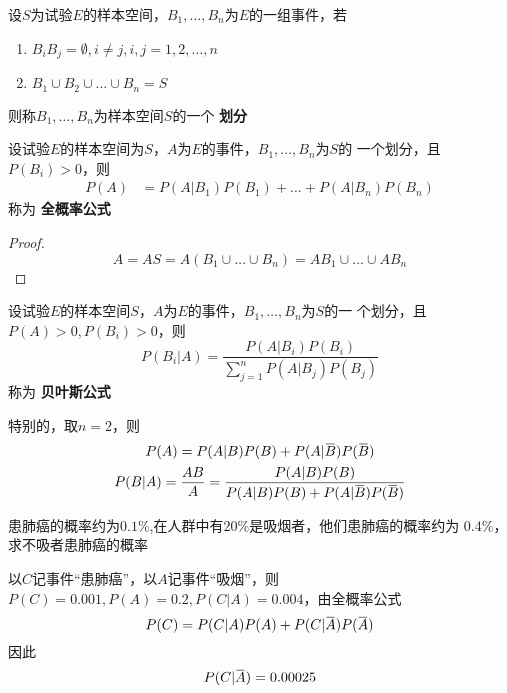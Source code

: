 \documentclass[11pt]{article}
\begin{document}
\begin{definition}[]
设\(S\)为试验\(E\)的样本空间，\(B_1,\dots,B_n\)为\(E\)的一组事件，若
\begin{enumerate}
\item \(B_iB_j=\emptyset,i\neq j,i,j=1,2,\dots,n\)
\item \(B_1\cup B_2\cup\dots\cup B_n=S\)
\end{enumerate}


则称\(B_1,\dots,B_n\)为样本空间\(S\)的一个 \textbf{划分}
\end{definition}

\begin{theorem}[]
设试验\(E\)的样本空间为\(S\)，\(A\)为\(E\)的事件，\(B_1,\dots,B_n\)为\(S\)的
一个划分，且\(\iffalse<\fi P(B_i)>0\)，则
\begin{align*}
P(A)&=P(A|B_1)P(B_1)+\dots+P(A|B_n)P(B_n)
\end{align*}
称为 \textbf{全概率公式} 
\end{theorem}

\begin{proof}
\begin{equation*}
A=AS=A(B_1\cup\dots\cup B_n)=AB_1\cup\dots\cup AB_n
\end{equation*}
\end{proof}

\begin{theorem}[]
设试验\(E\)的样本空间\(S\)，\(A\)为\(E\)的事件，\(B_1,\dots,B_n\)为\(S\)的一
个划分，且\(P(A)>0,P(B_i)>0\)，则
\begin{equation*}
P(B_i|A)=\frac{P(A|B_i)P(B_i)}{\sum_{j=1}^nP(A|B_j)P(B_j)}
\end{equation*}
称为 \textbf{贝叶斯公式}
\end{theorem}

特别的，取\(n=2\)，则
\begin{gather*}
P(A)=P(A|B)P(B)+P(A|\bbar{B})P(\bbar{B})\\
P(B|A)=\frac{AB}{A}=\frac{P(A|B)P(B)}
{P(A|B)P(B)+P(A|\bbar{B})P(\bbar{B})}
\end{gather*}

\begin{examplle}[]
患肺癌的概率约为\(0.1\%\),在人群中有\(20\%\)是吸烟者，他们患肺癌的概率约为
\(0.4\%\)，求不吸者患肺癌的概率

以\(C\)记事件“患肺癌”，以\(A\)记事件“吸烟”，则
\(P(C)=0.001,P(A)=0.2,P(C|A)=0.004\)，由全概率公式
\begin{equation*}
P(C)=P(C|A)P(A)+P(C|\bbar{A})P(\bbar{A})
\end{equation*}
因此
\begin{equation*}
P(C|\bbar{A})=0.00025
\end{equation*}
\end{examplle}
\end{document}
